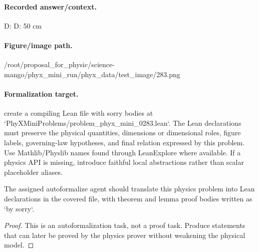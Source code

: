 \paragraph{Recorded answer/context.}
D: D: 50 cm

\paragraph{Figure/image path.}
/root/proposal\_for\_physic/science-mango/phyx\_mini\_run/phyx\_data/test\_image/283.png

\paragraph{Formalization target.}
create a compiling Lean file with sorry bodies at `PhyXMiniProblems/problem\_phyx\_mini\_0283.lean`. The Lean declarations must preserve the physical quantities, dimensions or dimensional roles, figure labels, governing-law hypotheses, and final relation expressed by this problem.
Use Mathlib/Physlib names found through LeanExplore where available. If a physics API is missing, introduce faithful local abstractions rather than scalar placeholder aliases.

\begin{theorem}
\label{thm:physics:phyx_mini_0283:target}
The assigned autoformalize agent should translate this physics problem into Lean declarations in the covered file, with theorem and lemma proof bodies written as `by sorry`.
\end{theorem}
\begin{proof}
This is an autoformalization task, not a proof task. Produce statements that can later be proved by the physics prover without weakening the physical model.
\end{proof}

